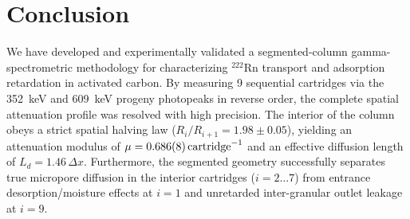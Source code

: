 \documentclass[11pt,a4paper]{article}
\begin{document}
\section{Conclusion}
We have developed and experimentally validated a segmented-column gamma-spectrometric methodology for characterizing $^{222}\text{Rn}$ transport and adsorption retardation in activated carbon. By measuring 9 sequential cartridges via the \SI{352}{keV} and \SI{609}{keV} progeny photopeaks in reverse order, the complete spatial attenuation profile was resolved with high precision. The interior of the column obeys a strict spatial halving law ($R_i/R_{i+1} = 1.98 \pm 0.05$), yielding an attenuation modulus of $\mu = \SI{0.686 \pm 0.008}{cartridge^{-1}}$ and an effective diffusion length of $L_d = 1.46\,\Delta x$. Furthermore, the segmented geometry successfully separates true micropore diffusion in the interior cartridges ($i=2\dots 7$) from entrance desorption/moisture effects at $i=1$ and unretarded inter-granular outlet leakage at $i=9$.

\appendix
\end{document}
